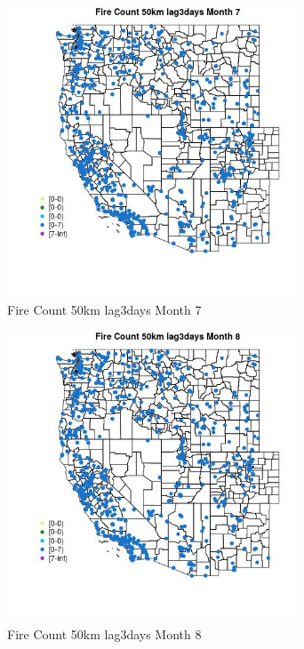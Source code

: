 \begin{figure} 
\centering  
\includegraphics[width=0.77\textwidth]{Code_Outputs/Report_ML_input_PM25_Step4_part_e_de_duplicated_aves_compiled_2019-05-21wNAs_MapObsMo7Fire_Count_50km_lag3days.jpg} 
\caption{\label{fig:Report_ML_input_PM25_Step4_part_e_de_duplicated_aves_compiled_2019-05-21wNAsMapObsMo7Fire_Count_50km_lag3days}Fire Count 50km lag3days Month 7} 
\end{figure} 
 

\begin{figure} 
\centering  
\includegraphics[width=0.77\textwidth]{Code_Outputs/Report_ML_input_PM25_Step4_part_e_de_duplicated_aves_compiled_2019-05-21wNAs_MapObsMo8Fire_Count_50km_lag3days.jpg} 
\caption{\label{fig:Report_ML_input_PM25_Step4_part_e_de_duplicated_aves_compiled_2019-05-21wNAsMapObsMo8Fire_Count_50km_lag3days}Fire Count 50km lag3days Month 8} 
\end{figure} 
 

